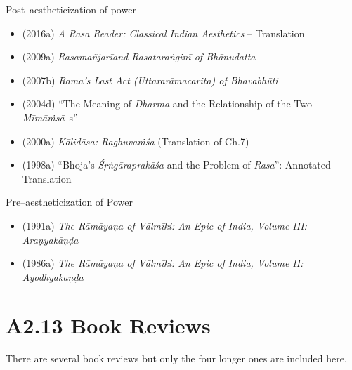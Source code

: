 Post–aestheticization of power

\begin{itemize}
\item (2016a) \textit{A Rasa Reader: Classical Indian Aesthetics} – Translation

 \item (2009a) \textit{Rasamañjarīand Rasataraṅginī of Bhānudatta}

 \item (2007b) \textit{Rama's Last Act (Uttararāmacarita) of Bhavabhūti}

 \item (2004d) “The Meaning of \textit{Dharma} and the Relationship of the Two \textit{Mīmāṁsā}–s”

 \item (2000a) \textit{Kālidāsa: Raghuvaṁśa} (Translation of Ch.7)

 \item (1998a) “Bhoja's \textit{Śṛṅgāraprakāśa} and the Problem of \textit{Rasa}”: Annotated Translation

\end{itemize}

Pre–aestheticization of Power

\begin{itemize}
\item (1991a) \textit{The Rāmāyaṇa of Vālmīki: An Epic of India, Volume III: Araṇyakāṇḍa}

 \item (1986a) \textit{The Rāmāyaṇa of Vālmīki: An Epic of India, Volume II: Ayodhyākāṇḍa }

\end{itemize}


\section*{A2.13 Book Reviews}

There are several book reviews but only the four longer ones are included here.


